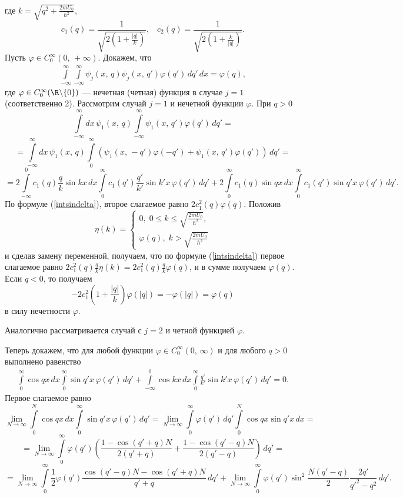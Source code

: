 \documentclass[a4paper
]{article}
\begin{document}
где $k=\sqrt{q^2+\frac{2mU_0}{\hbar^2}}$, $$c_1(q)=\frac{1}{\sqrt{2(1+\frac{|q|}
{k})}}, \; \; \; c_2(q)=\frac{1}{\sqrt{2(1+\frac{k}{|q|})}}.$$ Пусть $\varphi\in
C_0^\infty(0, \, +\infty)$. Докажем, что
\begin{align}
\label{intsincosdelta}
\int \limits_{-\infty}^\infty \int \limits_{-\infty}^\infty \psi_j(x, \, q)
\psi_j(x, \, q')\varphi(q')\, dq'\, dx=\varphi(q),
\end{align}
где $\varphi\in C_0^\infty(\R\backslash \{0\})$
--- нечетная (четная) функция в случае $j=1$ (соответственно 2). Рассмотрим
случай $j=1$ и нечетной функции $\varphi$. При $q>0$
$$\int \limits_{-\infty}^\infty dx\, \psi_1(x, \, q)
\int \limits_{-\infty}^\infty \psi_1(x, \, q')\varphi(q')\, dq'=$$ $$=\int \limits_{-\infty}
^\infty dx\, \psi_1(x, \, q)\int\limits_0^\infty (\psi_1(x, \, -q')\varphi(-q')+\psi_1(x, \,
q')\varphi(q'))\, dq'=$$
$$=2\int \limits_{-\infty}^0 c_1(q)\frac{q}{k}\sin kx \, dx \int \limits_0
^\infty c_1(q')\frac{q'}{k'}\sin k'x\, \varphi(q')\,
dq'+2\int \limits_0 ^\infty c_1(q)\sin qx\, dx\int
\limits_0^\infty c_1(q')\sin q'x\, \varphi(q')\, dq'.$$ По формуле
(\ref{intsindelta}), второе слагаемое равно $2c_1^2(q)\varphi(q)$.
Положив $$\eta(k)=\left\{\begin{array}{l}0, \; 0\le k\le
\sqrt{\frac{2mU_0} {\hbar^2}}, \\ \varphi(q), \;
k>\sqrt{\frac{2mU_0}{\hbar^2}}\end{array} \right.$$ и сделав
замену переменной, получаем, что по формуле (\ref{intsindelta})
первое слагаемое равно $2c_1^2(q)\frac{q}{k}
\eta(k)= 2c_1^2(q)\frac{q}{k}\varphi(q)$, и в сумме получаем
$\varphi(q)$. Если $q<0$, то получаем
$$-2c_1^2\left(1+\frac{|q|}{k}\right)\varphi(|q|)=
-\varphi(|q|)=\varphi(q)$$ в силу нечетности $\varphi$. \par
Аналогично рассматривается случай с $j=2$ и четной функцией
$\varphi$. \par Теперь докажем, что для любой функции $\varphi\in
C_0^\infty(0, \, \infty)$ и для любого $q>0$ выполнено равенство
\begin{align}
\label{intsincos0}
\int\limits_0^\infty \cos qx\, dx\int\limits_0^\infty \sin q'x\, \varphi(q')
\, dq'+\int \limits _{-\infty}^0\cos kx\, dx\int\limits_0^\infty
\frac{q'}{k'}\sin k'x\,\varphi(q')\, dq'=0.
\end{align}
Первое слагаемое равно $$\lim \limits_{N\rightarrow \infty}\int \limits
_0^N \cos qx\, dx\int\limits_0^\infty \sin q'x\, \varphi(q')\, dq'=
\lim \limits_{N\rightarrow \infty}\int\limits_0^\infty \varphi(q')
\, dq'\int\limits_0^N\cos qx \sin q'x\, dx=$$ $$=\lim
\limits_{N\rightarrow \infty}\int\limits_0^\infty
\varphi(q')\left(\frac{1-\cos(q'+q)N}{2(q'+q)} +\frac{1-\cos
(q'-q)N}{2(q'-q)}\right)\, dq'=$$ $$=\lim_{N\rightarrow\infty}
\int \limits_0^\infty \frac12
\varphi(q')\frac{\cos(q'-q)N-\cos(q'+q)N} {q'+q}\,
dq'+\lim\limits_{N\rightarrow \infty}\int \limits_0^\infty
\varphi(q')\sin^2\frac{N(q'-q)}{2}\frac{2q'}{q'^2-q^2}\, dq'.$$
\end{document}
